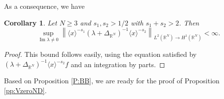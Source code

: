 \documentclass[10pt,leqno]{amsart}
\DeclareMathOperator{\im}{Im} %
\newtheorem{corollary}[theorem]{Corollary}
\newtheorem{remark}[theorem]{Remark}
\theoremstyle{definition}%
\theoremstyle{remark}
\numberwithin{equation}{section}
\newcommand{\R}{\mathbb{R}}
\renewcommand{\^}{\widehat}%
\begin{document}
As a consequence, we have
\begin{corollary}
	\label{crl:free_resolvent}
	Let $N\ge 3$ and $s_1,s_2>1/2$ with $s_1+s_2>2$. Then 
	$$
	\sup_{\im \lambda\neq 0} \left\| \langle x\rangle ^{-s_1} \left( \lambda+\Delta_{\R^N}\right)^{-1}\langle x\rangle^{-s_2} \right\|_{L^2(\R^N)\to H^1(\R^N)}<\infty.$$
\end{corollary}
\begin{proof}
	 This bound follows easily, using the equation satisfied by $(\lambda+\Delta_{\R^N})^{-1}\langle x\rangle^{-s_2}f$ and an integration by parts.
\end{proof}
Based on Proposition \ref{P:BB}, we are ready for  the proof of Proposition \ref{pp:VzeroND}.
\end{document}
